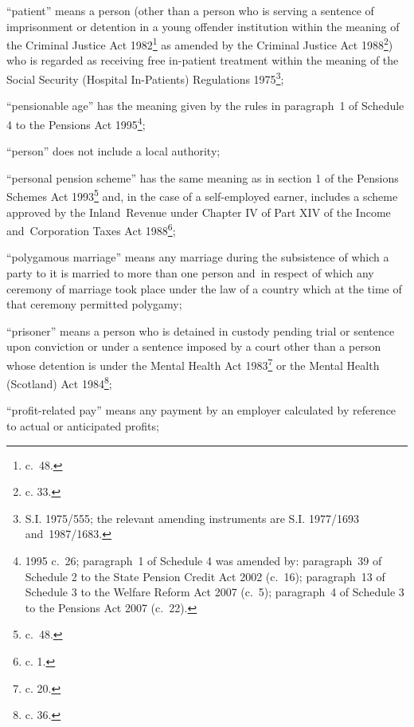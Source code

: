 \documentclass[12pt,a4paper]{article}
\begin{document}
\begin{enumerate}
“patient” means a person (other than a person who is serving a sentence of imprisonment or detention in a young offender institution within the meaning of the Criminal Justice Act 1982\footnote{ c.~48.} as amended by the Criminal Justice Act 1988\footnote{ c. 33.}) who is regarded as receiving free in-patient treatment within the meaning of the Social Security (Hospital In-Patients) Regulations 1975\footnote{\frenchspacing S.I. 1975/555; the relevant amending instruments are S.I. 1977/1693 and~1987/1683.};

“pensionable age” has the meaning given by the rules in paragraph~1 of Schedule 4 to the Pensions Act 1995\footnote{1995 c.~26; paragraph~1 of Schedule 4 was amended by: paragraph~39 of Schedule 2 to the State Pension Credit Act 2002  (c.~16); paragraph~13 of Schedule 3 to the Welfare Reform Act 2007 (c.~5); paragraph~4 of Schedule 3 to the Pensions Act 2007 (c.~22).};

“person” does not include a local authority;

“personal pension scheme” has the same meaning as in 
section 1 of the Pensions Schemes Act 1993\footnote{ c.~48.}  %
and, in the case of a self-employed earner, includes a scheme approved by the Inland~Revenue under Chapter IV of Part XIV of the Income and~Corporation Taxes Act 1988\footnote{ c. 1.};

“polygamous marriage” means any marriage during the subsistence of which a party to it is married to more than one person and~in respect of which any ceremony of marriage took place under the law of a country which at the time of that ceremony permitted polygamy;

“prisoner” means a person who is detained in custody pending trial or sentence upon conviction or under a sentence imposed by a court other than a person whose detention is under the Mental Health Act 1983\footnote{ c. 20.} or the Mental Health (Scotland) Act 1984\footnote{ c. 36.};

“profit-related pay” means any payment by an employer calculated by reference to actual or anticipated profits;


\end{enumerate}
\end{document}
